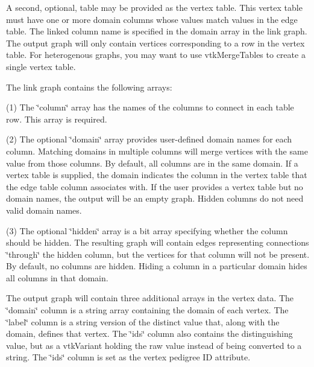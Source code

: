 A second, optional, table may be provided as the vertex table. This vertex table must have one or more domain columns whose values match values in the edge table. The linked column name is specified in the domain array in the link graph. The output graph will only contain vertices corresponding to a row in the vertex table. For heterogenous graphs, you may want to use vtk\-Merge\-Tables to create a single vertex table.

The link graph contains the following arrays\-:

(1) The \char`\"{}column\char`\"{} array has the names of the columns to connect in each table row. This array is required.

(2) The optional \char`\"{}domain\char`\"{} array provides user-\/defined domain names for each column. Matching domains in multiple columns will merge vertices with the same value from those columns. By default, all columns are in the same domain. If a vertex table is supplied, the domain indicates the column in the vertex table that the edge table column associates with. If the user provides a vertex table but no domain names, the output will be an empty graph. Hidden columns do not need valid domain names.

(3) The optional \char`\"{}hidden\char`\"{} array is a bit array specifying whether the column should be hidden. The resulting graph will contain edges representing connections \char`\"{}through\char`\"{} the hidden column, but the vertices for that column will not be present. By default, no columns are hidden. Hiding a column in a particular domain hides all columns in that domain.

The output graph will contain three additional arrays in the vertex data. The \char`\"{}domain\char`\"{} column is a string array containing the domain of each vertex. The \char`\"{}label\char`\"{} column is a string version of the distinct value that, along with the domain, defines that vertex. The \char`\"{}ids\char`\"{} column also contains the distinguishing value, but as a vtk\-Variant holding the raw value instead of being converted to a string. The \char`\"{}ids\char`\"{} column is set as the vertex pedigree I\-D attribute.

